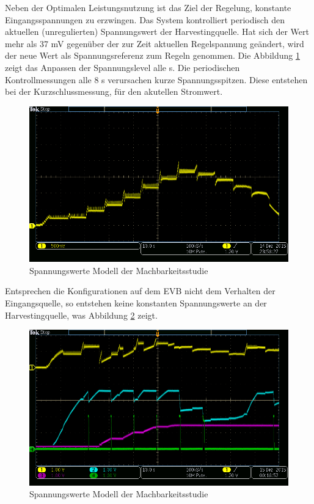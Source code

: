 Neben der Optimalen Leistungsnutzung ist das Ziel der Regelung, konstante Eingangsspannungen zu erzwingen. Das System kontrolliert periodisch den aktuellen (unregulierten) Spannungswert der Harvestingquelle. Hat sich der Wert mehr als 37 mV gegenüber der zur Zeit aktuellen Regelspannung geändert, wird der neue Wert als Spannungsreferenz zum Regeln genommen. Die Abbildung \ref{RegelungSpannung} zeigt das Anpassen der Spannungslevel alle s. Die periodischen Kontrollmessungen alle 8 s verursachen kurze Spannungsspitzen. Diese entstehen bei der Kurzschlussmessung, für den akutellen Stromwert.

\begin{figure}
    \includegraphics[bb = 0 0 100 100]{2TheoretischeGrundlagen/imag/RegelungVHRV.png}
    \caption{Spannungswerte Modell der Machbarkeitsstudie}\label{RegelungSpannung} 
\end{figure}

Entsprechen die Konfigurationen auf dem EVB nicht dem Verhalten der Eingangsquelle, so entstehen keine konstanten Spannungswerte an der Harvestingquelle, was Abbildung \ref{falscheRegelung} zeigt.

\begin{figure}
    \includegraphics[bb = 0 0 100 100]{2TheoretischeGrundlagen/imag/falscheRegelung.png}
    \caption{Spannungswerte Modell der Machbarkeitsstudie}\label{falscheRegelung} 
\end{figure}

